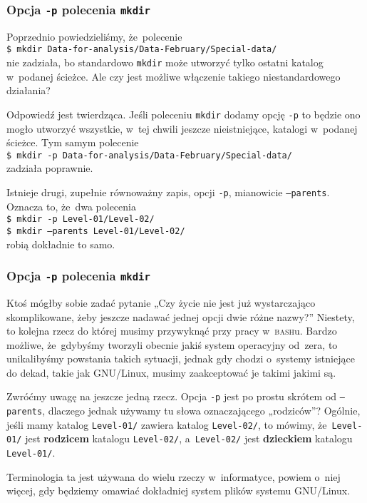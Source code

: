 \documentclass[10pt,t]{beamer}
\begin{document}
\begin{frame}
  \frametitle{Opcja \texttt{-p} polecenia \texttt{mkdir}}


  Poprzednio powiedzieliśmy, że~polecenie \\
  \texttt{\$ mkdir Data-for-analysis/Data-February/Special-data/} \\
  nie zadziała, bo standardowo \texttt{mkdir} może utworzyć tylko ostatni
  katalog w~podanej ścieżce. Ale czy jest możliwe włączenie takiego
  niestandardowego działania?

  Odpowiedź jest twierdząca. Jeśli poleceniu \texttt{mkdir} dodamy
  opcję \texttt{-p} to będzie ono mogło utworzyć wszystkie, w~tej
  chwili jeszcze nieistniejące, katalogi w~podanej ścieżce. Tym samym
  polecenie \\
  \texttt{\$ mkdir -p Data-for-analysis/Data-February/Special-data/} \\
  zadziała poprawnie.

  Istnieje drugi, zupełnie równoważny zapis, opcji \texttt{-p}, mianowicie
  \texttt{--parents}. Oznacza to, że~dwa polecenia \\
  \texttt{\$ mkdir -p Level-01/Level-02/} \\
  \texttt{\$ mkdir --parents Level-01/Level-02/} \\
  robią dokładnie to samo.

\end{frame}





\begin{frame}
  \frametitle{Opcja \texttt{-p} polecenia \texttt{mkdir}}


  Ktoś mógłby sobie zadać pytanie „Czy życie nie jest już wystarczająco
  skomplikowane, żeby jeszcze nadawać jednej opcji dwie różne nazwy?”
  Niestety, to kolejna rzecz do której musimy przywyknąć przy pracy
  w~\textsc{bash}u. Bardzo możliwe, że~gdybyśmy tworzyli obecnie jakiś
  system operacyjny od~zera, to unikalibyśmy powstania takich sytuacji,
  jednak gdy chodzi o~systemy istniejące do dekad, takie jak GNU/Linux,
  musimy zaakceptować je takimi jakimi są.

  Zwróćmy uwagę na jeszcze jedną rzecz. Opcja \texttt{-p} jest po prostu
  skrótem od \texttt{--parents}, dlaczego jednak używamy tu słowa
  oznaczającego „rodziców”? Ogólnie, jeśli mamy katalog \texttt{Level-01/}
  zawiera katalog \texttt{Level-02/}, to mówimy, że~\texttt{Level-01/}
  jest \textbf{rodzicem} katalogu \texttt{Level-02/}, a~\texttt{Level-02/}
  jest \textbf{dzieckiem} katalogu \texttt{Level-01/}.

  Terminologia ta jest używana do wielu rzeczy w~informatyce, powiem o~niej
  więcej, gdy będziemy omawiać dokładniej system plików systemu GNU/Linux.

\end{frame}
\end{document}
